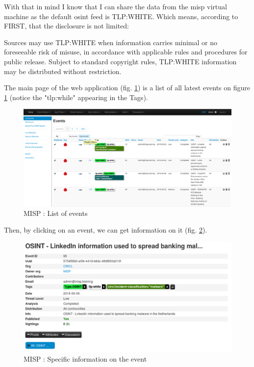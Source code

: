 \documentclass{eplmastersthesis}
\begin{document}
With that in mind I know that I can share the data from the \gls{misp} virtual machine as the default \gls{osint} feed is TLP:WHITE. Which means, according to FIRST, that the disclosure is not limited: \\

\begin{boxedverbatim}
	Sources may use TLP:WHITE when information carries minimal or no foreseeable 
	risk of misuse, in accordance with applicable rules and procedures for public 
	release. Subject to standard copyright rules, TLP:WHITE information may be 
	distributed without restriction.
\end{boxedverbatim}

The main page of the web application (fig. \ref{webevents}) is a list of all latest events on figure \ref{webevents} (notice the "tlp:while" appearing in the Tags).

\begin{figure}[!h]
	\begin{center}
		\includegraphics[scale=0.32]{res/webEvents}
		\caption{MISP : List of events}
		\label{webevents}
	\end{center}
\end{figure}


Then, by clicking on an event, we can get information on it (fig. \ref{webevent}).


\begin{figure}[!h]
	\begin{center}
		\includegraphics[scale=0.35]{res/webEvent}
		\caption{MISP : Specific information on the event}
		\label{webevent}
	\end{center}
\end{figure}
\end{document}

